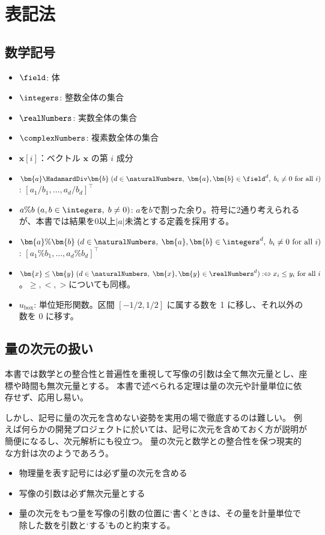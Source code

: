 \part{表記法}
	\chapter{数学記号}
		\newcommand*{\uBox}{u_\text{box}}
		\begin{itemize}
			\item $\field$: 体
			\item $\integers$: 整数全体の集合
			\item $\realNumbers$: 実数全体の集合
			\item $\complexNumbers$: 複素数全体の集合
			\item $\bm{x}[i]$：ベクトル $\bm{x}$ の第 $i$ 成分
			\item $\bm{a} \HadamardDiv \bm{b}\;(d \in \naturalNumbers,\;\bm{a},\bm{b} \in \field^d,\;b_i\neq 0 \text{ for all }i)$: $[a_1/b_1,\dots,a_d/b_d]^\top$
			\item $a\%b\;(a,b\in\integers,\;b\neq 0)$: $a$を$b$で割った余り。符号に2通り考えられるが、本書では結果を0以上$|a|$未満とする定義を採用する。
			\item $\bm{a}\%\bm{b}\;(d\in\naturalNumbers,\;\bm{a},\bm{b} \in \integers^d,\; b_i\neq 0 \text{ for all }i)$: $[a_1\%b_1,\dots,a_d\%b_d]^\top$
			\item $\bm{x} \leq \bm{y}\;(d\in\naturalNumbers,\;\bm{x},\bm{y} \in \realNumbers^d) :\Leftrightarrow x_i \leq y_i \text{ for all }i$。$\geq, <, >$についても同様。
			\item $\uBox$: 単位矩形関数。区間 $[-1/2,1/2]$ に属する数を 1 に移し、それ以外の数を 0 に移す。
		\end{itemize}
	\chapter{量の次元の扱い}
		本書では数学との整合性と普遍性を重視して写像の引数は全て無次元量とし、座標や時間も無次元量とする。
		本書で述べられる定理は量の次元や計量単位に依存せず、応用し易い。
		\par
		しかし、記号に量の次元を含めない姿勢を実用の場で徹底するのは難しい。
		例えば何らかの開発プロジェクトに於いては、記号に次元を含めておく方が説明が簡便になるし、次元解析にも役立つ。
		量の次元と数学との整合性を保つ現実的な方針は次のようであろう。
		\begin{itemize}
			\item 物理量を表す記号には必ず量の次元を含める
			\item 写像の引数は必ず無次元量とする
			\item 量の次元をもつ量を写像の引数の位置に‘書く’ときは、その量を計量単位で除した数を引数と‘する’ものと約束する。
		\end{itemize}
